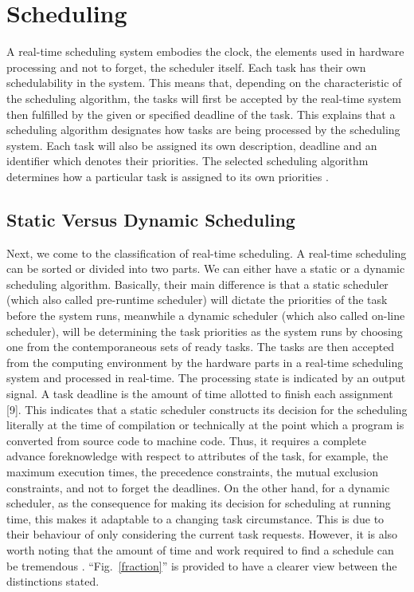 \section{Scheduling}

A real-time scheduling system embodies the clock, the elements used in hardware processing and not to forget, the scheduler itself. Each task has their own schedulability in the system. This means that, depending on the characteristic of the scheduling algorithm, the tasks will first be accepted by the real-time system then fulfilled by the given or specified deadline of the task. This explains that a scheduling algorithm designates how tasks are being processed by the scheduling system. Each task will also be assigned its own description, deadline and an identifier which denotes their priorities. The selected scheduling algorithm determines how a particular task is assigned to its own priorities \cite{b9}.

\subsection{Static Versus Dynamic Scheduling}

Next, we come to the classification of real-time scheduling. A real-time scheduling can be sorted or divided into two parts. We can either have a static or a dynamic scheduling algorithm. Basically, their main difference is that a static scheduler (which also called pre-runtime scheduler) will dictate the priorities of the task before the system runs, meanwhile a dynamic scheduler (which also called on-line scheduler), will be determining the task priorities as the system runs by choosing one from the contemporaneous sets of ready tasks. The tasks are then accepted from the computing environment by the hardware parts in a real-time scheduling system and processed in real-time. The processing state is indicated by an output signal. A task deadline is the amount of time allotted to finish each assignment [9].
This indicates that a static scheduler constructs its decision for the scheduling literally at the time of compilation or technically at the point which a program is converted from source code to machine code. Thus, it requires a complete advance foreknowledge with respect to attributes of the task, for example, the maximum execution times, the precedence constraints, the mutual exclusion constraints, and not to forget the deadlines. On the other hand, for a dynamic scheduler, as the consequence for making its decision for scheduling at running time, this makes it adaptable to a changing task circumstance. This is due to their behaviour of only considering the current task requests. However, it is also worth noting that the amount of time and work required to find a schedule can be tremendous \cite{b3}. ``Fig.~\ref{fraction}'' is provided to have a clearer view between the distinctions stated.

